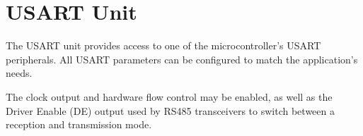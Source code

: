 \section{USART Unit}

The USART unit provides access to one of the microcontroller's USART peripherals. All USART parameters can be configured to match the application's needs. 

The clock output and hardware flow control may be enabled, as well as the Driver Enable (DE) output used by RS485 transceivers to switch between a reception and transmission mode.









